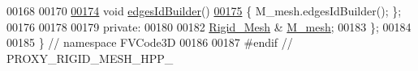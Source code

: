\begin{DoxyCode}
00168 
00170 
\hypertarget{ProxyRigidMesh_8hpp_source.tex_l00174}{}\hyperlink{classFVCode3D_1_1ProxyRigidMesh_abe43d7d836af41c1b8cdc18cd07d9068}{00174}     \textcolor{keywordtype}{void} \hyperlink{classFVCode3D_1_1ProxyRigidMesh_abe43d7d836af41c1b8cdc18cd07d9068}{edgesIdBuilder}()
\hypertarget{ProxyRigidMesh_8hpp_source.tex_l00175}{}\hyperlink{classFVCode3D_1_1ProxyRigidMesh_a4f2b91a915de9b510d4897df2583bfe1}{00175}         \{ M\_mesh.edgesIdBuilder(); \};
00176 
00178 
00179 \textcolor{keyword}{private}:
00180 
00182     \hyperlink{classFVCode3D_1_1Rigid__Mesh}{Rigid\_Mesh} & \hyperlink{classFVCode3D_1_1ProxyRigidMesh_a4f2b91a915de9b510d4897df2583bfe1}{M\_mesh};
00183 \};
00184 
00185 \} \textcolor{comment}{// namespace FVCode3D}
00186 
00187 \textcolor{preprocessor}{#endif // PROXY\_RIGID\_MESH\_HPP\_}
\end{DoxyCode}
